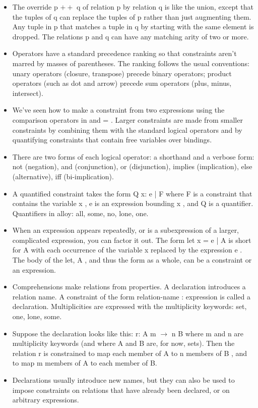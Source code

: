 \documentclass[11pt]{article}
\begin{document}
\begin{enumerate}
\begin{minipage}{\minpagw}
{{\begin{itemize}
    \item The override p $++$ q of relation p by relation q is like the union, except that the tuples of q can replace the tuples of p rather than just augmenting them. Any tuple in p that matches a tuple in q by starting with the same element is dropped. The relations p and q can have any matching arity of two or more.
    \item Operators have a standard precedence ranking so that constraints aren’t marred by masses of parentheses. The ranking follows the usual conventions: unary operators (closure, transpose) precede binary operators; product operators (such as dot and arrow) precede sum operators (plus, minus, intersect).
    \item We’ve seen how to make a constraint from two expressions using the comparison operators in and = . Larger constraints are made from smaller constraints by combining them with the standard logical operators and by quantifying constraints that contain free variables over bindings.
    \item There are two forms of each logical operator: a shorthand and a verbose form: not (negation), and (conjunction), or (disjunction), implies (implication), else (alternative), iff (bi-implication).
    \item A quantified constraint takes the form Q x: e | F where F is a constraint that contains the variable x , e is an expression bounding x , and Q is a quantifier. Quantifiers in alloy: all, some, no, lone, one.
    \item When an expression appears repeatedly, or is a subexpression of a larger, complicated expression, you can factor it out. The form let x = e | A is short for A with each occurrence of the variable x replaced by the expression e . The body of the let, A , and thus the form as a whole, can be a constraint or an expression. 
    \item Comprehensions make relations from properties. A declaration introduces a relation name. A constraint of the form relation-name : expression is called a declaration. Multiplicities are expressed with the multiplicity keywords: set, one, lone, some.
    \item Suppose the declaration looks like this: r: A m $\rightarrow$ n B where m and n are multiplicity keywords (and where A and B are, for now, sets). Then the relation r is constrained to map each member of A to n members of B , and to map m members of A to each member of B.
    \item Declarations usually introduce new names, but they can also be used to impose constraints on relations that have already been declared, or on arbitrary expressions.

\end{itemize}}}
\end{minipage}
\end{enumerate}
\end{document}
